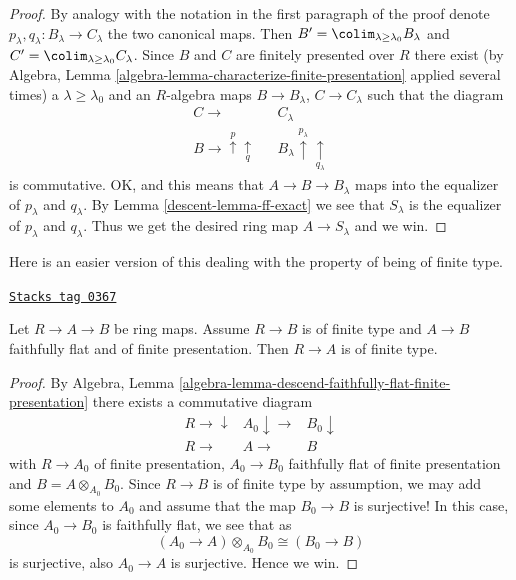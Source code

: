 \begin{proof}
\medskip\noindent
By analogy with the notation in the first paragraph of the proof denote
$p_\lambda, q_\lambda : B_\lambda \to C_\lambda$ the two canonical maps.
Then $B' = \colim_{\lambda \geq \lambda_0} B_\lambda$
and $C' = \colim_{\lambda \geq \lambda_0} C_\lambda$.
Since $B$ and $C$ are finitely presented over $R$ there exist
(by Algebra, Lemma \ref{algebra-lemma-characterize-finite-presentation}
applied several times)
a $\lambda \geq \lambda_0$ and an $R$-algebra maps
$B \to B_\lambda$, $C \to C_\lambda$ such that
the diagram
$$
\begin{array}{ccc}C \longrightarrow &  & C_\lambda \\ B \longrightarrow\overset{p}{\uparrow}\underset{q}{\uparrow} &  & B_\lambda
\overset{p_\lambda}{\uparrow}\underset{q_\lambda}{\uparrow}\end{array}
$$
is commutative. OK, and this means that $A \to B \to B_\lambda$
maps into the equalizer of $p_\lambda$ and $q_\lambda$.
By Lemma \ref{descent-lemma-ff-exact} we
see that $S_\lambda$ is the equalizer of $p_\lambda$ and $q_\lambda$.
Thus we get the desired ring map $A \to S_\lambda$ and we win.
\end{proof}

Here is an easier version of this dealing with the property
of being of finite type.

\begin{lemma}
\label{descent-lemma-finite-type-local-source-fppf-algebra}
\href{https://stacks.math.columbia.edu/tag/0367}{\texttt{Stacks tag 0367}}

Let $R \to A \to B$ be ring maps.
Assume $R \to B$ is of finite type and
$A \to B$ faithfully flat and of finite presentation.
Then $R \to A$ is of finite type.
\end{lemma}

\begin{proof}
By
Algebra, Lemma \ref{algebra-lemma-descend-faithfully-flat-finite-presentation}
there exists a commutative diagram
$$
\begin{array}{ccc}R \longrightarrow\downarrow & A_0 \downarrow\longrightarrow & B_0 \downarrow \\ R \longrightarrow & A \longrightarrow & B\end{array}
$$
with $R \to A_0$ of finite presentation,
$A_0 \to B_0$ faithfully flat of finite presentation
and $B = A \otimes_{A_0} B_0$. Since $R \to B$ is of finite
type by assumption, we may add some elements to $A_0$ and assume
that the map $B_0 \to B$ is surjective!
In this case, since $A_0 \to B_0$ is faithfully flat, we see
that as
$$
(A_0 \to A) \otimes_{A_0} B_0 \cong (B_0 \to B)
$$
is surjective, also $A_0 \to A$ is surjective. Hence we win.
\end{proof}


